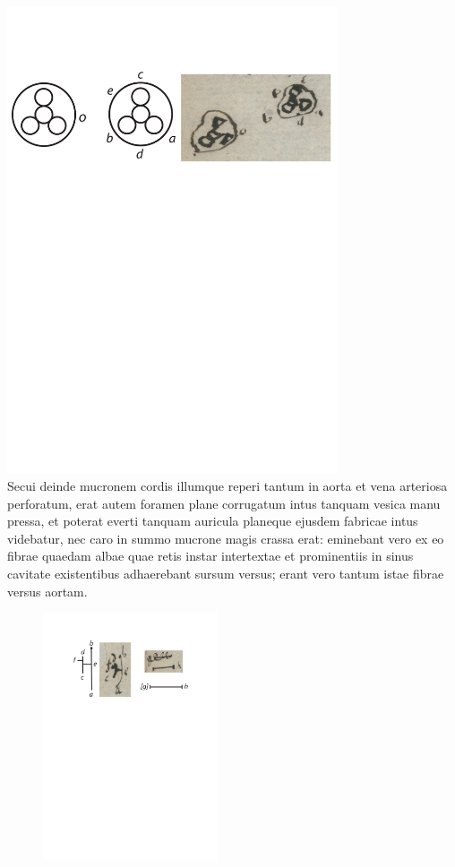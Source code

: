 \includegraphics[trim = 0mm -3mm 0mm 0mm, clip, width=0.73\textwidth]{images/lh0040104b_005v1.pdf}\\
\pend%
\vspace{1.5em}%
\pstart%
Secui deinde mucronem cordis illumque reperi tantum in aorta et vena arteriosa perforatum, erat autem foramen plane corrugatum intus tanquam vesica manu pressa, et poterat everti tanquam auricula planeque ejusdem fabricae intus videbatur, nec caro in summo mucrone magis crassa erat: eminebant vero ex eo fibrae quaedam albae quae retis instar intertextae et prominentiis in sinus cavitate existentibus adhaerebant sursum versus; erant vero tantum istae fibrae versus aortam.
\pend
\pstart%
\begin{figure}
\vspace{-4mm}\includegraphics[trim = 1mm 0mm -3mm -5mm, clip,width=0.46\textwidth]{images/lh0040104b_005v3.pdf}\\
\end{figure}
